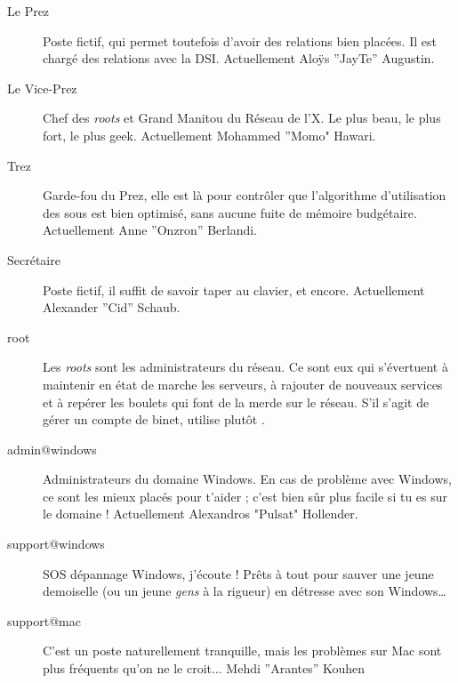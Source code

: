\begin{description}

  \item[Le Prez]{Poste fictif, qui permet toutefois d'avoir des relations bien plac\'ees. Il est charg\'e des relations avec la DSI. Actuellement Aloÿs ''JayTe'' Augustin.}
  
  \item[Le Vice-Prez]{Chef des \emph{roots} et Grand Manitou du R\'eseau de l'X. Le plus beau, le plus fort, le plus geek. Actuellement Mohammed ''Momo" Hawari.}

  \item[Trez]{Garde-fou du Prez, elle est l\`a pour contr\^oler que l'algorithme d'utilisation des sous est bien optimis\'e, sans aucune fuite de m\'emoire budg\'etaire. Actuellement Anne ''Onzron'' Berlandi.}

  \item[Secr\'etaire]{Poste fictif, il suffit de savoir taper au clavier, et encore. Actuellement Alexander ''Cid'' Schaub.}

  \item[root]{Les \emph{roots} sont les administrateurs du r\'eseau. Ce sont eux qui s'\'evertuent \`a maintenir en \'etat de marche les serveurs, \`a rajouter de 
  nouveaux services et \`a rep\'erer les boulets qui font de la merde sur le r\'eseau. S'il s'agit de g\'erer un compte de binet, utilise plut\^ot .}

  \item[admin@windows] {Administrateurs du domaine Windows. En cas de probl\`eme avec Windows, ce sont les mieux plac\'es pour t'aider ;
  c'est bien s\^ur  plus facile si tu es sur le domaine ! Actuellement Alexandros "Pulsat" Hollender.}
  
  \item[support@windows] {SOS d\'epannage Windows, j'\'ecoute ! Pr\^ets \`a tout pour sauver une jeune demoiselle (ou un jeune \emph{gens} \`a la rigueur) en d\'etresse avec son Windows\dots }

  \item[support@mac] {C'est un poste naturellement tranquille, mais les probl\`emes sur Mac sont plus fr\'equents qu'on ne le croit... Mehdi ''Arantes'' Kouhen}
  
  


\end{description}
